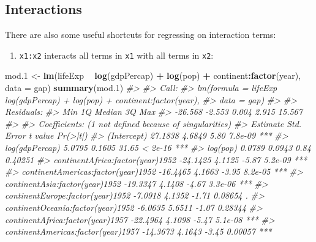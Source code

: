 \documentclass[]{book}
\newenvironment{Shaded}{\begin{snugshade}}{\end{snugshade}}
\newcommand{\KeywordTok}[1]{\textcolor[rgb]{0.13,0.29,0.53}{\textbf{#1}}}
\newcommand{\DataTypeTok}[1]{\textcolor[rgb]{0.13,0.29,0.53}{#1}}
\newcommand{\DecValTok}[1]{\textcolor[rgb]{0.00,0.00,0.81}{#1}}
\newcommand{\StringTok}[1]{\textcolor[rgb]{0.31,0.60,0.02}{#1}}
\newcommand{\CommentTok}[1]{\textcolor[rgb]{0.56,0.35,0.01}{\textit{#1}}}
\newcommand{\OperatorTok}[1]{\textcolor[rgb]{0.81,0.36,0.00}{\textbf{#1}}}
\newcommand{\NormalTok}[1]{#1}
\providecommand{\tightlist}{%
  \setlength{\itemsep}{0pt}\setlength{\parskip}{0pt}}
\begin{document}
\subsection{Interactions}\label{interactions}

There are also some useful shortcuts for regressing on interaction
terms:

\begin{enumerate}
\def\labelenumi{\arabic{enumi}.}
\tightlist
\item
  \texttt{x1:x2} interacts all terms in \texttt{x1} with all terms in
  \texttt{x2}:
\end{enumerate}

\begin{Shaded}
\begin{Highlighting}[]
\NormalTok{mod.}\DecValTok{1}\NormalTok{ <-}\StringTok{ }\KeywordTok{lm}\NormalTok{(lifeExp }\OperatorTok{~}\StringTok{ }\KeywordTok{log}\NormalTok{(gdpPercap) }\OperatorTok{+}\StringTok{ }\KeywordTok{log}\NormalTok{(pop) }\OperatorTok{+}\StringTok{ }\NormalTok{continent}\OperatorTok{:}\KeywordTok{factor}\NormalTok{(year), }\DataTypeTok{data =}\NormalTok{ gap)}
\KeywordTok{summary}\NormalTok{(mod.}\DecValTok{1}\NormalTok{)}
\CommentTok{#> }
\CommentTok{#> Call:}
\CommentTok{#> lm(formula = lifeExp ~ log(gdpPercap) + log(pop) + continent:factor(year), }
\CommentTok{#>     data = gap)}
\CommentTok{#> }
\CommentTok{#> Residuals:}
\CommentTok{#>     Min      1Q  Median      3Q     Max }
\CommentTok{#> -26.568  -2.553   0.004   2.915  15.567 }
\CommentTok{#> }
\CommentTok{#> Coefficients: (1 not defined because of singularities)}
\CommentTok{#>                                    Estimate Std. Error t value Pr(>|t|)    }
\CommentTok{#> (Intercept)                         27.1838     4.6849    5.80  7.8e-09 ***}
\CommentTok{#> log(gdpPercap)                       5.0795     0.1605   31.65  < 2e-16 ***}
\CommentTok{#> log(pop)                             0.0789     0.0943    0.84  0.40251    }
\CommentTok{#> continentAfrica:factor(year)1952   -24.1425     4.1125   -5.87  5.2e-09 ***}
\CommentTok{#> continentAmericas:factor(year)1952 -16.4465     4.1663   -3.95  8.2e-05 ***}
\CommentTok{#> continentAsia:factor(year)1952     -19.3347     4.1408   -4.67  3.3e-06 ***}
\CommentTok{#> continentEurope:factor(year)1952    -7.0918     4.1352   -1.71  0.08654 .  }
\CommentTok{#> continentOceania:factor(year)1952   -6.0635     5.6511   -1.07  0.28344    }
\CommentTok{#> continentAfrica:factor(year)1957   -22.4964     4.1098   -5.47  5.1e-08 ***}
\CommentTok{#> continentAmericas:factor(year)1957 -14.3673     4.1643   -3.45  0.00057 ***}

\end{Highlighting}
\end{Shaded}
\end{document}
